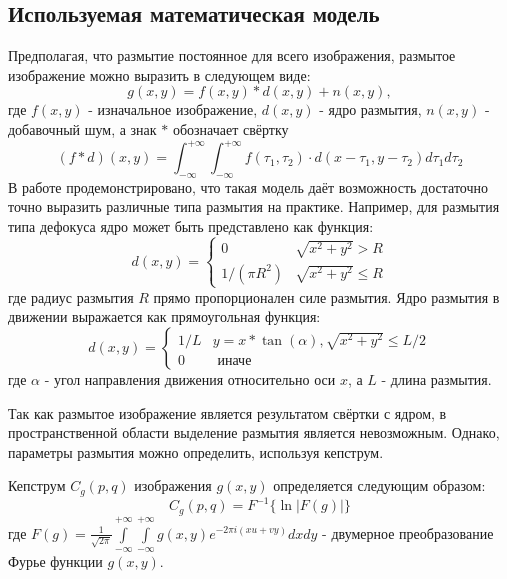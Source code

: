 \subsection{Используемая математическая модель }
Предполагая, что размытие постоянное для всего изображения, 
размытое изображение можно выразить в следующем виде:
\begin{equation}
g(x, y)=f(x, y) * d(x, y)+n(x, y),
\label{conv_formula}
\end{equation}
где $f(x,y)$ - изначальное изображение, $d(x, y)$ - ядро размытия, $n(x,y)$ - добавочный шум, а знак $*$ обозначает свёртку $$(f * d)(x, y)=\int_{-\infty}^{+\infty} \int_{-\infty}^{+\infty} f\left(\tau_{1}, \tau_{2}\right) \cdot d\left(x-\tau_{1}, y-\tau_{2}\right) d \tau_{1} d \tau_{2}$$
В работе \cite{kopeika} продемонстрировано, что такая модель даёт возможность достаточно точно выразить различные типа размытия на практике. 
Например, для размытия типа дефокуса ядро может быть представлено как функция:
\begin{equation}
d(x, y)=\left\{\begin{array}{ll}
0 & \sqrt{x^{2}+y^{2}}>R \\
1 /\left(\pi R^{2}\right) & \sqrt{x^{2}+y^{2}} \leq R
\end{array}\right.
\end{equation}
где радиус размытия $R$ прямо пропорционален силе размытия. 
Ядро размытия в движении выражается как прямоугольная функция:
\begin{equation}
d(x, y)=\left\{\begin{array}{ll}
 1/L & y = x * \tan(\alpha), \sqrt{x^{2}+y^{2}} \leq L/2 \\
0 & \text { иначе}
\end{array}\right.
\end{equation}
где  $\alpha$  - угол направления движения относительно оси $x$, 
а $L$ - длина размытия.
\par
Так как размытое изображение является результатом свёртки с ядром, в пространственной области выделение размытия является невозможным. Однако, параметры размытия можно определить, используя кепструм.

Кепструм $C_{g}(p, q)$ изображения $g(x,y)$ определяется следующим образом:
\begin{equation}C_{g}(p, q)=F^{-1}\{\ln |F(g)|\}
\label{cepstrum_def}
\end{equation}
где  $F(g) = \frac{1}{\sqrt{2 \pi}} \int\limits_{-\infty}^{+\infty} \int\limits_{-\infty}^{+\infty} g(x, y) e^{-2 \pi i (x u+v y)} d x d y$  - двумерное преобразование Фурье функции $g(x,y)$.



